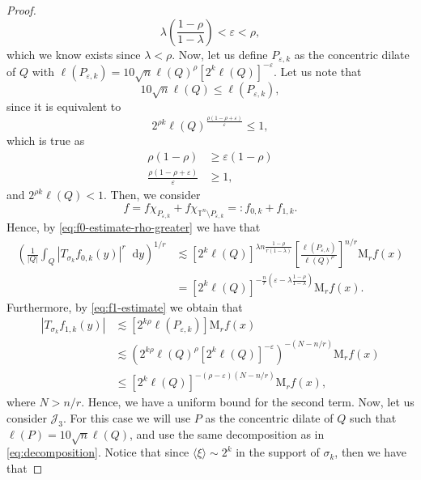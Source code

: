 \documentclass[12pt, reqno]{amsart}
\theoremstyle{definition}
\theoremstyle{remark}
\numberwithin{equation}{section}
\newcommand*\diff{\mathop{}\!\mathrm{d}}
\begin{document}
\begin{proof}
    \begin{equation*}
        \lambda \left( \frac{1-\rho}{1-\lambda} \right) < \varepsilon < \rho,
    \end{equation*}
    which we know exists since $\lambda < \rho$. Now, let us define $P_{\varepsilon, k}$ as the concentric dilate of $Q$  with $\ell(P_{\varepsilon, k}) = 10 \sqrt{n}\ell(Q)^\rho [2^k\ell(Q)]^{-\varepsilon} $. Let us note that 
    \begin{equation*}
        10\sqrt{n} \ell(Q) \leq \ell(P_{\varepsilon, k}),
    \end{equation*}
    since it is equivalent to 
    \begin{equation*}
        2^{\rho k} \ell(Q)^{\frac{\rho(1-\rho + \varepsilon)}{\varepsilon} } \leq 1, 
    \end{equation*}
    which is true as 
    \begin{align*}
        \rho(1-\rho) & \geq \varepsilon(1-\rho) \\
        \frac{\rho(1-\rho + \varepsilon)}{\varepsilon} & \geq 1,
    \end{align*}
    and $2^{\rho k}\ell(Q) < 1$. Then, we consider 
    \begin{equation*}
        f = f\chi_{P_{\varepsilon, k}} + f\chi_{ \mathbb{T}^n\setminus P_{\varepsilon, k}} =: f_{0,k} + f_{1,k}.
    \end{equation*}
    Hence, by \cref{eq:f0-estimate-rho-greater} we have that 
    \begin{align*}
        \left( \frac{1}{|Q|}\int_Q |T_{\sigma_k} f_{0, k}(y)|^r \diff y 
        \right)^{1/r} & \lesssim [2^k\ell(Q)]^{\lambda n \frac{1-\rho}{r(1-\lambda)}} \left[ \frac{\ell(P_{\varepsilon, k}) }{\ell(Q)^\rho} \right]^{n/r} \mathrm{M}_rf(x)\\
        & =  [2^k\ell(Q)]^{-\frac{n}{r}\left(\varepsilon - \lambda \frac{1-\rho}{1-\lambda}\right)} \mathrm{M}_rf(x).
    \end{align*}
    Furthermore, by \cref{eq:f1-estimate} we obtain that
    \begin{align*}
        |T_{\sigma_k}f_{1, k}(y)| & \lesssim [2^{k\rho}\ell(P_{\varepsilon,k})]\mathrm{M}_rf(x)\\
        & \lesssim\left( 2^{k\rho}\ell(Q)^\rho [2^k\ell(Q)]^{-\varepsilon} 
        \right)^{-(N-n/r)} \mathrm{M}_rf(x) \\
        & \leq [2^k\ell(Q)]^{-(\rho-\varepsilon)(N-n/r)}\mathrm{M}_rf(x),        
    \end{align*}
    where $N>n/r$. Hence, we have a uniform bound for the second term. Now, let us consider $\mathcal{J}_3$. For this case we will use $P$ as the concentric dilate of $Q$ such that $\ell(P)=10\sqrt{n}\ell(Q)$, and use the same decomposition as in \cref{eq:decomposition}. Notice that since $\langle\xi\rangle \sim 2^k$ in the support of $\sigma_k$, then we have that

\end{proof}
\end{document}

